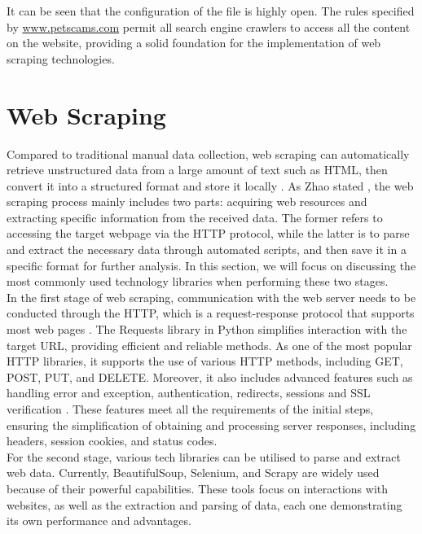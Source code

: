 \documentclass[ oneside,%
                    author={Cassie Qing Tang},
                    degree={BSc},
                     title={The Report for 3D Modelling of Queens Library \\ },
                    subtitle={ }]{dissertation}
\begin{document}
It can be seen that the configuration of the file is highly open. The rules specified by \url{www.petscams.com} permit all search engine crawlers to access all the content on the website, providing a solid foundation for the implementation of web scraping technologies.


\section{Web Scraping}
Compared to traditional manual data collection, web scraping can automatically retrieve unstructured data from a large amount of text such as HTML, then convert it into a structured format and store it locally \cite{khder_web_2021}. As Zhao stated \cite{zhao_web_2017}, the web scraping process mainly includes two parts: acquiring web resources and extracting specific information from the received data. The former refers to accessing the target webpage via the HTTP protocol, while the latter is to parse and extract the necessary data through automated scripts, and then save it in a specific format for further analysis. In this section, we will focus on discussing the most commonly used technology libraries when performing these two stages.
\\

In the first stage of web scraping, communication with the web server needs to be conducted through the HTTP, which is a request-response protocol that supports most web pages \cite{chandra_python_2015}. The Requests library in Python simplifies interaction with the target URL, providing efficient and reliable methods. As one of the most popular HTTP libraries, it supports the use of various HTTP methods, including GET, POST, PUT, and DELETE. Moreover, it also includes advanced features such as handling error and exception, authentication, redirects, sessions and SSL verification \cite{noauthor_requests_nodate}. These features meet all the requirements of the initial steps, ensuring the simplification of obtaining and processing server responses, including headers, session cookies, and status codes.
\\

For the second stage, various tech libraries can be utilised to parse and extract web data. Currently, BeautifulSoup, Selenium, and Scrapy are widely used because of their powerful capabilities. These tools focus on interactions with websites, as well as the extraction and parsing of data, each one demonstrating its own performance and advantages.
\\
\end{document}
